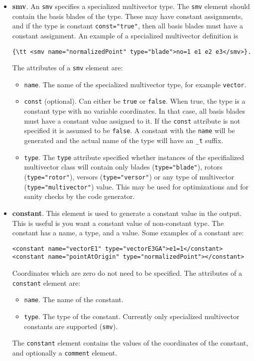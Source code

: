 \documentclass[10pt, a4paper]{article}
\begin{document}
\begin{itemize}
         
\item {\bf smv}. An {\tt smv} specifies a specialized multivector type. 
      The {\tt smv} element should contain the basis blades of the type. These may have constant assignments, and if the
      type is constant {\tt const="true"}, then all basis blades must have a constant assignment. An example of a specialized
      multivector definition is
\begin{verbatim}
{\tt <smv name="normalizedPoint" type="blade">no=1 e1 e2 e3</smv>}.
\end{verbatim}     
      The attributes of a {\tt smv} element are:
       \begin{itemize}
       \item {\tt name}. The name of the specialized multivector type, for example {\tt vector}.
       \item {\tt const} (optional). Can either be {\tt true} or {\tt false}. When true, the type is a constant type with no
           variable coordinates. In that case, all basis blades must have a constant value assigned to it. If the {\tt const}
           attribute is not specified it is assumed to be {\tt false}. A constant with the {\tt name} will be generated and the
           actual name of the type will have an {\tt \_t} suffix.
       \item {\tt type}. The {\tt type} attribute specified whether instances of the specifialized multivector class will contain
           only blades ({\tt type="blade"}), rotors ({\tt type="rotor"}), versors ({\tt type="versor"}) or any type of multivector  
           ({\tt type="multivector"}) value. This may be used for optimizations and for sanity checks by the code generator.
       \end{itemize}
       
\item {\bf constant}. This element is used to generate a constant value in the output. This is useful is you
      want a constant value of non-constant type. The constant has a name, 
      a type, and a value. Some examples of a constant are:
\begin{verbatim}
<constant name="vectorE1" type="vectorE3GA">e1=1</constant>
<constant name="pointAtOrigin" type="normalizedPoint"></constant>
\end{verbatim}
      Coordinates which are zero do not need to be specified. The attributes of a {\tt constant} element are:
       \begin{itemize}
       \item {\tt name}. The name of the constant.
       \item {\tt type}. The type of the constant. Currently only specialized multivector constants are supported ({\tt smv}).
       \end{itemize}
      The {\tt constant} element contains the values of the coordinates of the constant, and optionally a {\tt comment} element.
      

\end{itemize}
\end{document}
